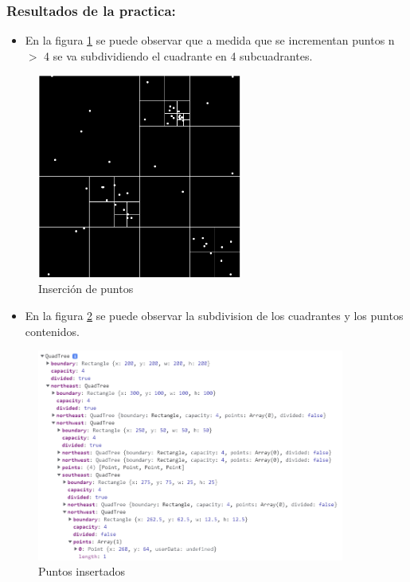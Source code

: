 \documentclass{article}
\begin{document}
\subsubsection{Resultados de la practica: }

\begin{itemize}
	\item En la figura \ref{fig:quadtree_insert} se puede observar que a medida que se incrementan puntos n $>$ 4 se va subdividiendo el cuadrante en 4 subcuadrantes.
\end{itemize}

\begin{figure}[h!]
	\centering
	\includegraphics[width=0.6\textwidth]{img/quadtree_insert.png}
	\caption{Inserción de puntos}
	\label{fig:quadtree_insert}
\end{figure}

\begin{itemize}
	\item En la figura \ref{fig:quadtree_insert_data} se puede observar la subdivision de los cuadrantes y los puntos contenidos.
\end{itemize}

\begin{figure}[h!]
	\centering
	\includegraphics[width=0.9\textwidth]{img/quadtree_insert_data.png}
	\caption{Puntos insertados}
	\label{fig:quadtree_insert_data}
\end{figure}
\end{document}
